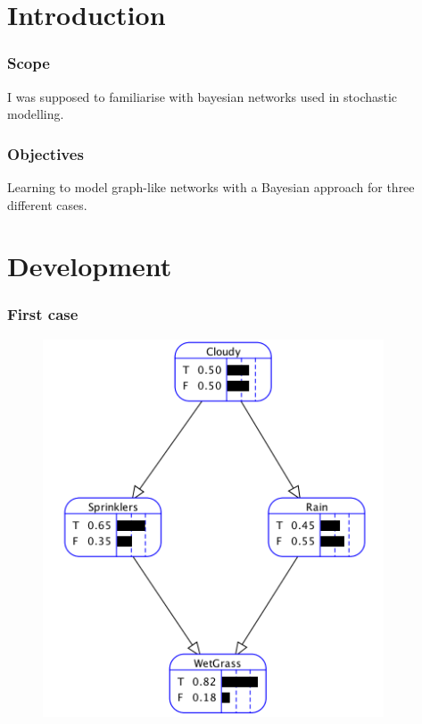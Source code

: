 \documentclass{article}
\begin{document}
			\renewcommand{\lstlistingname}{Code}

			
			\part{Introduction}
			
				\section{Scope}
I was supposed to familiarise with bayesian networks used in stochastic modelling. 
				\section{Objectives}
				Learning to model graph-like networks with a Bayesian approach for three different cases.

\newpage
			\part{Development}
				\section{First case}
\begin{center}	
\begin{figure}
\centering
\includegraphics[width=0.9\textwidth]{fig1}
\caption{}
\label{fig:1}
\end{figure}
\end{center}
\end{document}
